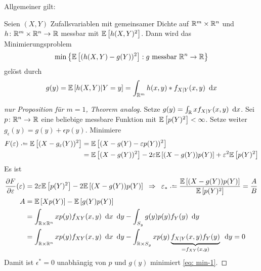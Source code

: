 Allgemeiner gilt:

\begin{theorem} %
	Seien $(X,Y)$ Zufallsvariablen mit gemeinsamer Dichte auf $\mathbb{R}^m \times \mathbb{R}^n$ und $\abb{h}{\R^m \times \Rn}{\R}$ messbar mit $\mathbb{E} \left[ h(X,Y)^2 \right]$. Dann wird das Minimierungsproblem
	\begin{equation*}
	\min\left\{ \mathbb{E} \left[ (h(X,Y)-g(Y))^2 \right] : g \text{ messbar } \mathbb{R}^n \to \mathbb{R} \right\}
	\end{equation*}
	gelöst durch
	\begin{equation*}
	g(y) = \mathbb{E} \left[ h(X,Y) | Y = y \right] = \int_{\mathbb{R}^m} h(x,y) * f_{X|Y}(x,y) \enskip \mathrm{d}x
	\end{equation*}
\end{theorem}

\begin{proof}[nur Proposition für $m=1$, Theorem analog]
	Setze $g(y) = \int_{\mathbb{R}} x f_{X|Y}(x,y) \enskip \mathrm{d}x$. Sei $\abb{p}{\Rn}{\R}$ eine beliebige messbare Funktion mit $\mathbb{E} \left[ p(Y)^2 \right]< \infty$. Setze weiter $g_\epsilon(y) = g(y) + \epsilon p(y)$. Minimiere
	\begin{equation*}
	\begin{aligned}
		F(\epsilon) \defeq \EW[(X-g_\epsilon(Y))^2] 
		&= \EW[(X - g(Y) - \epsilon p(Y))^2] \\
		&= \EW[(X-g(Y))^2] - 2\epsilon \EW[(X-g(Y)) p(Y)] + \epsilon^2 \EW[p(Y)^2]
	\end{aligned}
	\end{equation*}
	Es ist
	\begin{equation*}
	\begin{aligned}
	\frac{\partial F}{\partial \epsilon}(\epsilon) &= 2\epsilon \EW[p(Y)^2] - 2\EW[(X-g(Y)) p(Y)]  \follows \epsilon_\ast \defeq\frac{\EW[(X-g(Y))p(Y)]}{\EW[p(Y)^2]} = \frac{A}{B} \\
	A &= \EW[Xp(Y)] - \EW[g(Y) p(Y)]  \\
	&= \int_{\R \times \Rn} x p(y) f_{XY}(x,y) \dx \dy - \int_{S_y} g(y) p(y) f_Y(y) \dy \\
	&= \int_{\R \times \Rn} x p(y) f_{XY}(x,y) \dx \dy - \int_{\R \times S_y} x p(y) \underbrace{f_{X|Y}(x,y) f_Y(y)}_{=f_{XY}(x,y)} \dy = 0
	\end{aligned}
	\end{equation*}
	Damit ist $\epsilon^\ast = 0$ unabhängig von $p$ und $g(y)$ minimiert \eqref{eq: min-1}.
\end{proof}

